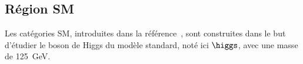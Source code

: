 \subsection{Région \og SM \fg{}}\label{chapter-HTT_analysis-section-categorisation-SM}
Les catégories SM, introduites dans la référence~\cite{CMS-PAS-HIG-19-010}, sont construites dans le but d'étudier le boson de Higgs du modèle standard, noté ici $\higgs$, avec une masse de \SI{125}{\GeV}.
